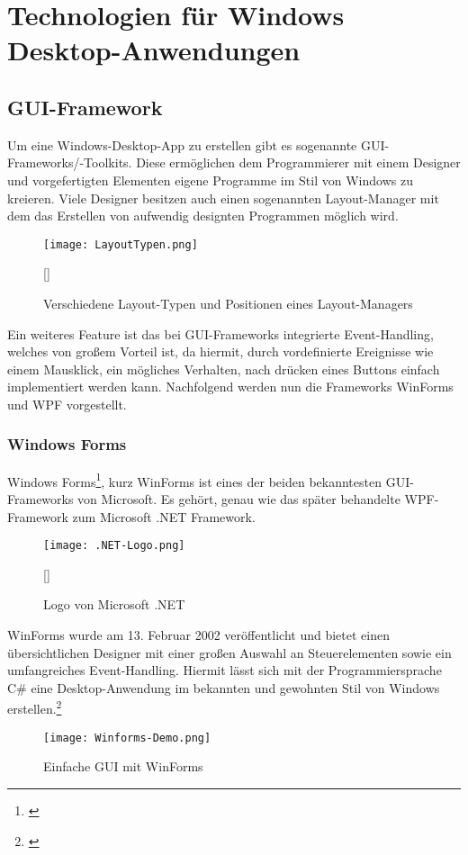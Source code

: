 \chapter{Technologien für Windows Desktop-Anwendungen}
\label{chap:TechnologienfürWindowsDesktop-Anwendungen}

\section{GUI-Framework}

Um eine Windows-Desktop-App zu erstellen gibt es sogenannte GUI-Frameworks/-Toolkits. Diese ermöglichen dem Programmierer mit einem Designer und vorgefertigten Elementen eigene Programme im Stil von Windows zu kreieren. 
Viele Designer besitzen auch einen sogenannten Layout-Manager mit dem das Erstellen von aufwendig designten Programmen möglich wird. 
\\
\begin{figure}[H]
    \centering
    \texttt{[image: LayoutTypen.png]}
    \caption[Layout-Typen]{Verschiedene Layout-Typen und Positionen eines Layout-Managers}[\cite{Layout}]
\end{figure}
\noindent 
Ein weiteres Feature ist das bei GUI-Frameworks integrierte Event-Handling, welches von großem Vorteil ist, da hiermit, durch vordefinierte Ereignisse wie einem Mausklick, ein mögliches Verhalten, nach drücken eines Buttons einfach implementiert werden kann.
Nachfolgend werden nun die Frameworks WinForms und WPF vorgestellt.

\subsection{Windows Forms}

Windows Forms\footnote[1]{\cite[Vgl.][]{WindowsForms1}}, kurz WinForms ist eines der beiden bekanntesten GUI-Frameworks von Microsoft. Es gehört, genau wie das später behandelte WPF-Framework zum Microsoft 
.NET Framework.
\\
\begin{figure}[H]
    \centering
    \texttt{[image: .NET-Logo.png]}
    \caption[.Net-Logo]{Logo von Microsoft .NET}[\cite{DotNet}]
\end{figure}
\noindent
WinForms wurde am 13. Februar 2002 veröffentlicht und bietet einen übersichtlichen Designer mit einer großen Auswahl an Steuerelementen sowie ein umfangreiches Event-Handling. Hiermit lässt sich mit der Programmiersprache C\# eine Desktop-Anwendung im bekannten und gewohnten Stil von Windows erstellen.\footnote[2]{\cite[Vgl.][]{WindowsForms2}}
\\
\begin{figure}[H]
    \centering
    \texttt{[image: Winforms-Demo.png]}
    \caption{Einfache GUI mit WinForms} 
\end{figure}

